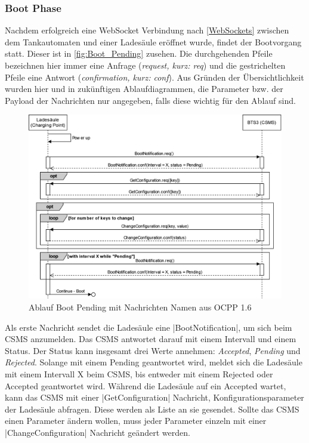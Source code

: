 \subsubsection{Boot Phase}
Nachdem erfolgreich eine WebSocket Verbindung nach \autoref{WebSockets} zwischen dem Tankautomaten und einer Ladesäule eröffnet wurde, findet der Bootvorgang statt. Dieser ist in \autoref{fig:Boot_Pending} zusehen. Die durchgehenden Pfeile bezeichnen hier immer eine Anfrage (\textit{request, kurz: req}) und die gestrichelten Pfeile eine Antwort (\textit{confirmation, kurz: conf}). Aus Gründen der Übersichtlichkeit wurden hier und in zukünftigen Ablaufdiagrammen, die Parameter bzw. der Payload der Nachrichten nur angegeben, falls diese wichtig für den Ablauf sind. 
\begin{figure}[H]
	\centering
	\includegraphics[width=1.0\textwidth]{images/OCPP/Boot_OCPP_v16.drawio.png}
	\caption{Ablauf Boot Pending mit Nachrichten Namen aus OCPP 1.6 \cite{Eigene_Darstellung, OCPP-1.6-edition-2}}
	\label{fig:Boot_Pending}
\end{figure}
\noindent Als erste Nachricht sendet die Ladesäule eine \spverb|BootNotification|, um sich beim \acs{CSMS} anzumelden. Das \acs{CSMS} antwortet darauf mit einem Intervall und einem Status. Der Status kann insgesamt drei Werte annehmen: 
\textit{Accepted}, \textit{Pending} und \textit{Rejected}. Solange mit einem Pending geantwortet wird, meldet sich die Ladesäule mit einem Intervall X beim \acs{CSMS}, bis entweder mit einem Rejected oder Accepted geantwortet wird. Während die Ladesäule auf ein Accepted wartet, kann das \acs{CSMS} mit einer \spverb|GetConfiguration| Nachricht, Konfigurationsparameter der Ladesäule abfragen. Diese werden als Liste an sie gesendet. Sollte das \acs{CSMS} einen Parameter ändern wollen, muss jeder Parameter einzeln mit einer \spverb|ChangeConfiguration| Nachricht geändert werden. \newline


